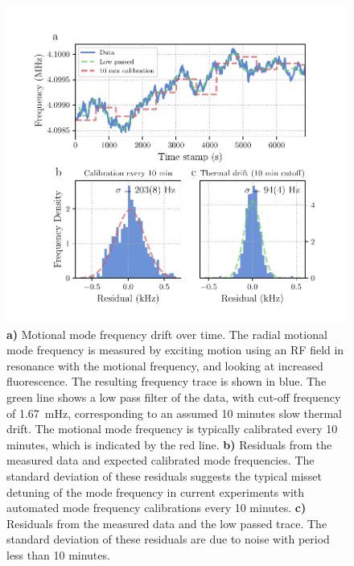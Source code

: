     \begin{figure}
        \begin{center}
        \noindent\includegraphics[width=\linewidth]{
            figures/pdf_figure/mode_drift.pdf
            }
        \end{center}
        \caption{
            \textbf{a)} Motional mode frequency drift over time. The radial motional mode frequency is measured by exciting motion using an RF field in resonance with the motional frequency, and looking at increased fluorescence. The resulting frequency trace is shown in blue. The green line shows a low pass filter of the data, with cut-off frequency of 1.67~\unit{\mHz}, corresponding to an assumed 10 minutes slow thermal drift. The motional mode frequency is typically calibrated every 10 minutes, which is indicated by the red line. 
            \textbf{b)} Residuals from the measured data and expected calibrated mode frequencies. The standard deviation of these residuals suggests the typical misset detuning of the mode frequency in current experiments with automated mode frequency calibrations every 10 minutes.
            \textbf{c)} Residuals from the measured data and the low passed trace. The standard deviation of these residuals are due to noise with period less than 10 minutes. 
            }
        \label{fig:mode drift}
    \end{figure}

